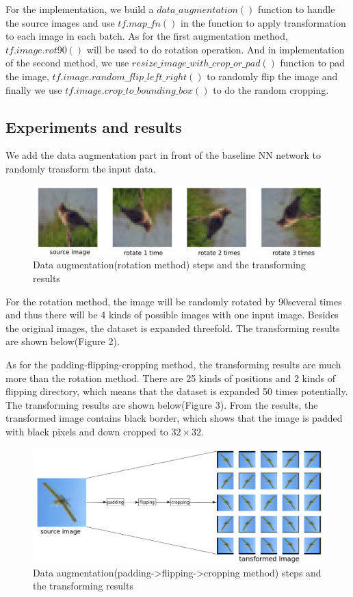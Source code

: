 \documentclass[]{article}
\begin{document}
For the implementation, we build a $data\_augmentation()$ function to handle the source images and use $tf.map\_fn()$ in the function to apply transformation to each image in each batch. As for the first augmentation method, $tf.image.rot90()$ will be used to do rotation operation. And in implementation of the second method, we use $resize\_image\_with\_crop\_or\_pad()$ function to pad the image, $tf.image.random\_flip\_left\_right()$ to randomly flip the image and finally we use $tf.image.crop\_to\_bounding\_box()$ to do the random cropping.
  
\subsection{Experiments and results}
We add the data augmentation part in front of the baseline NN network to randomly transform the input data.

\begin{figure}[!h]
\begin{center}
\includegraphics[width=5in]{rotate_plot}
\caption{Data augmentation(rotation method) steps and the transforming results}
\end{center}
\end{figure}

For the rotation method, the image will be randomly rotated by $90 $\textdegree several times and thus there will be 4 kinds of possible images with one input image. Besides the original images, the dataset is expanded threefold. The transforming results are shown below(Figure 2). 

As for the padding-flipping-cropping method, the transforming results are much more than the rotation method. There are 25 kinds of positions and 2 kinds of flipping directory, which means that the dataset is expanded 50 times potentially. The transforming results are shown below(Figure 3). From the results, the transformed image contains black border, which shows that the image is padded with black pixels and down cropped to $32\times 32$.

\begin{figure}[!h]
\begin{center}
\includegraphics[width=5in]{aug_plot} 
\caption{Data augmentation(padding->flipping->cropping method) steps and the transforming results}
\end{center}
\end{figure}
\end{document}
